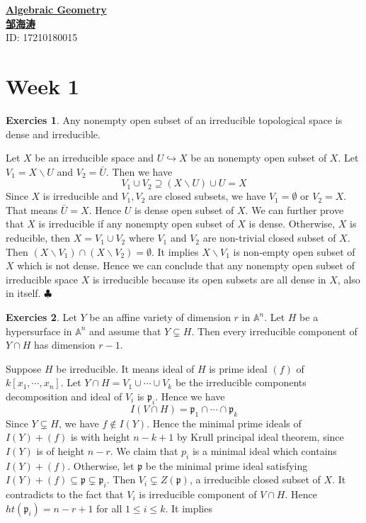 \documentclass[12pt,a4paper]{article}
\theoremstyle{definition}
\newtheorem{exer}{Exercies}[section]
\newcommand*{\qeds}{\hfill\ensuremath{\clubsuit}}
\begin{document}
\noindent
{\LARGE\underline{\textbf{Algebraic Geometry}}}\\
{\hfill\large  \underline{\textbf{邹海涛}} \\
	\hfill ID: 17210180015}\\
\section{Week 1}
\begin{exer}
	Any nonempty open subset of an irreducible topological space is dense and irreducible.
\end{exer}
Let $X$ be an irreducible space and $U \hookrightarrow X$ be an nonempty open subset of $X$. Let $V_1= X\backslash U $ and $V_2= \bar{U}$. Then we have
\[
V_1 \cup V_2 \supseteq (X \backslash U) \cup U =X
\]
Since $X$ is irreducible and $V_1, V_2$ are closed subsets, we have $V_1 = \emptyset$ or $V_2 = X$. That means $\bar{U} =X$. Hence $U$ is dense open subset of $X$.
We can further prove that $X$ is irreducible if any nonempty open subset of $X$ is dense. Otherwise, $X$ is reducible, then $X = V_1 \cup V_2$ where $V_1$ and $V_2$ are non-trivial closed subset of $X$. Then $(X\backslash V_1) \cap (X\backslash V_2) = \emptyset$. It implies $X\backslash V_1$ is non-empty open subset of $X$ which is not dense. Hence we can conclude that any nonempty open subset of irreducible space $X$ is irreducible because its open subsets are all dense in $X$, also in itself.
\qeds
\begin{exer}
	Let $Y$ be an affine variety of dimension $r$ in $\mathbb{A}^n$. Let $H$ be a hypersurface in $\mathbb{A}^n$ and assume that $Y \subsetneq H$. Then every irreducible component of $Y \cap H$ has dimension $r-1$.
\end{exer}
Suppose $H$ be irreducible. It means ideal of $H$ is prime ideal $(f)$ of $k[x_1, \cdots, x_n]$. Let $Y \cap H = V_1 \cup \cdots \cup V_k$ be the irreducible components decomposition and ideal of $V_i$ is $\mathfrak{p}_i$. Hence we have
\[
I(V \cap H) = \mathfrak{p}_1 \cap \cdots \cap \mathfrak{p}_k
\]
Since $Y \varsubsetneq H$, we have $f \notin I(Y)$. Hence the minimal prime ideals of $I(Y) + (f)$ is with height $n-k+1$ by Krull principal ideal theorem, since $I(Y)$ is of height $n-r$. We claim that $ p_i$ is a minimal ideal which contains $I(Y) + (f)$. Otherwise, let $\mathfrak{p}$ be the minimal prime ideal satisfying $I(Y)+(f) \subseteq \mathfrak{p} \subsetneq \mathfrak{p}_i$. Then $V_i \subsetneq Z(\mathfrak{p})$, a irreducible closed subset of $X$. It contradicts to the fact that $V_i$ is irreducible component of $V \cap H$. Hence $ht(\mathfrak{p}_i) = n-r+1$ for all $1 \leq i \leq k$. It implies 
\end{document}
